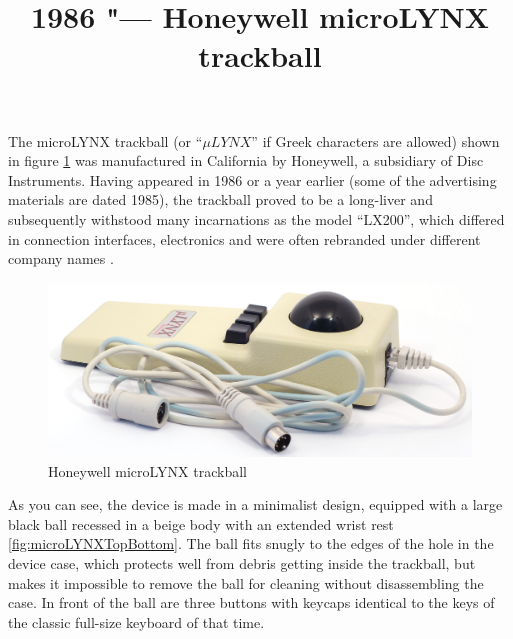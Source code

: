 \documentclass[11pt, a4paper]{article}
\begin{document}
\title{1986 "--- Honeywell microLYNX trackball}
\date{}
\maketitle

The microLYNX trackball (or “$\mu LYNX$” if Greek characters are allowed) shown in figure \ref{fig:microLYNXPic} was manufactured in California by Honeywell, a subsidiary of Disc Instruments. Having appeared in 1986 or a year earlier (some of the advertising materials are dated 1985), the trackball proved to be a long-liver and subsequently withstood many incarnations as the model “LX200”, which differed in connection interfaces, electronics and were often rebranded under different company names \cite{lx200}.

\begin{figure}[h]
    \centering
    \includegraphics[scale=0.45]{1986_honeywell_microlynx_trackball/pic_30.jpg}
    \caption{Honeywell microLYNX trackball}
    \label{fig:microLYNXPic}
\end{figure}

As you can see, the device is made in a minimalist design, equipped with a large black ball recessed in a beige body with an extended wrist rest \ref{fig:microLYNXTopBottom}. The ball fits snugly to the edges of the hole in the device case, which protects well from debris getting inside the trackball, but makes it impossible to remove the ball for cleaning without disassembling the case. In front of the ball are three buttons with keycaps identical to the keys of the classic full-size keyboard of that time.
\end{document}
